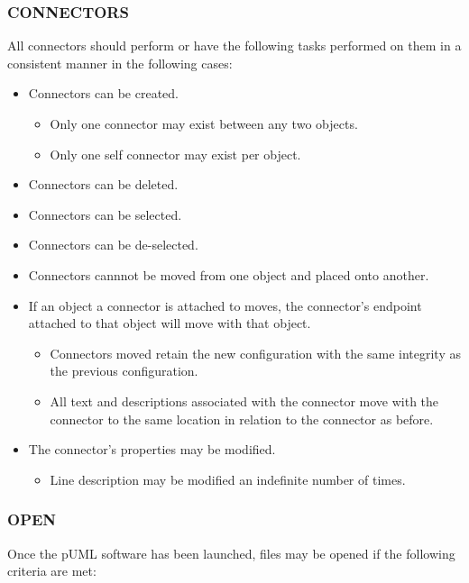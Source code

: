 \documentclass[twoside,letterpaper]{article}
\begin{document}
\bigskip

\subsubsection[CONNECTORS]{\bfseries CONNECTORS}

All connectors should perform or have the following tasks performed on them in a consistent manner in the following cases: 
\begin{itemize}
\item Connectors can be created.
\begin{itemize}
\item Only one connector may exist between any two objects.
\item Only one self connector may exist per object.
\end{itemize}
\item Connectors can be deleted.
\item Connectors can be selected.
\item Connectors can be de-selected.
\item Connectors cannnot be moved from one object and placed onto another. 
\item If an object a connector is attached to moves, the connector's endpoint attached to that object will move with that object. 
\begin{itemize}
\item Connectors moved retain the new configuration with the same integrity as the previous configuration.
\item All text and descriptions associated with the connector move with the connector to the same location in relation to the connector as before.
\end{itemize}
\item The connector's properties may be modified.
\begin{itemize}
\item Line description may be modified an indefinite number of times.
\end{itemize}
\end{itemize}

\bigskip

\subsubsection[OPEN]{\bfseries OPEN}

Once the pUML software has been launched, files may be opened if the following criteria are met:
\end{document}
